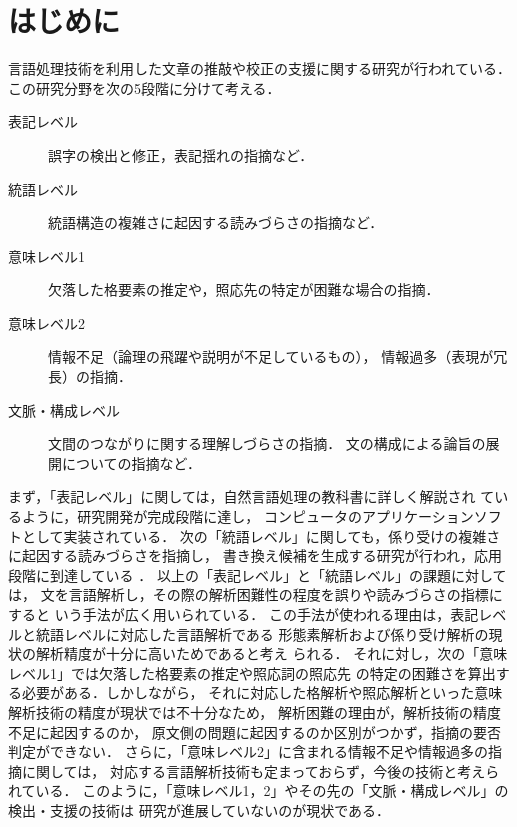 \documentclass[japanese]{jnlp_1.3e}
\begin{document}
\maketitle





\section{はじめに}
\label{はじめに}

言語処理技術を利用した文章の推敲や校正の支援に関する研究が行われている．
この研究分野を次の5段階に分けて考える．
 \begin{description}
  \item[表記レベル]
	     誤字の検出と修正，表記揺れの指摘など．
  \item[統語レベル]
	     統語構造の複雑さに起因する読みづらさの指摘など．
  \item[意味レベル1]
	     欠落した格要素の推定や，照応先の特定が困難な場合の指摘．
  \item[意味レベル2]
	     情報不足（論理の飛躍や説明が不足しているもの），
	     情報過多（表現が冗長）の指摘．
  \item[文脈・構成レベル]
	     文間のつながりに関する理解しづらさの指摘．
	     文の構成による論旨の展開についての指摘など．
 \end{description}

まず，「表記レベル」に関しては，自然言語処理の教科書\cite{tanaka}に詳しく解説され
ているように，研究開発が完成段階に達し\cite{ibuki}，
コンピュータのアプリケーションソフトとして実装されている\cite{kasahara}．
次の「統語レベル」に関しても，係り受けの複雑さに起因する読みづらさを指摘し，
書き換え候補を生成する研究が行われ，応用段階に到達している
\cite{yokobayashi}\cite{suganuma2006}
．
以上の「表記レベル」と「統語レベル」の課題に対しては，
文を言語解析し，その際の解析困難性の程度を誤りや読みづらさの指標にすると
いう手法が広く用いられている．
この手法が使われる理由は，表記レベルと統語レベルに対応した言語解析である
形態素解析および係り受け解析の現状の解析精度が十分に高いためであると考え
られる．
それに対し，次の「意味レベル1」では欠落した格要素の推定や照応詞の照応先
の特定の困難さを算出する必要がある．しかしながら，
それに対応した格解析や照応解析といった意味解析技術の精度が現状では不十分なため，
解析困難の理由が，解析技術の精度不足に起因するのか，
原文側の問題に起因するのか区別がつかず，指摘の要否判定ができない．
さらに，「意味レベル2」に含まれる情報不足や情報過多の指摘に関しては，
対応する言語解析技術も定まっておらず，今後の技術と考えられている．
このように，「意味レベル1，2」やその先の「文脈・構成レベル」の検出・支援の技術は
研究が進展していないのが現状である．
\end{document}
